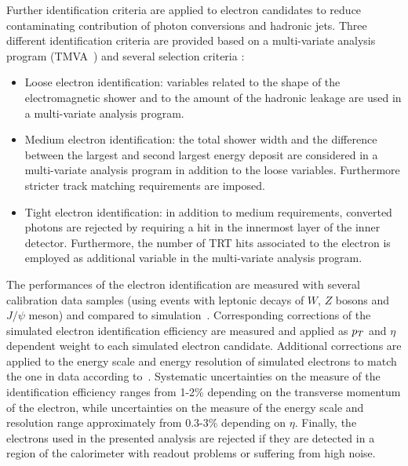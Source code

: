 Further identification criteria are applied to electron candidates to reduce contaminating contribution of 
photon conversions and hadronic jets. Three different identification criteria are provided based on a multi-variate
analysis program (TMVA~\cite{TMVA}) and several selection criteria :
\begin{itemize}
	\item Loose electron identification: variables related to the shape of the electromagnetic shower and 
	to the amount of the hadronic leakage are used in a multi-variate analysis program.
	\item Medium electron identification: the total shower width and the difference between the largest and second largest 
	energy deposit are considered in a multi-variate analysis program in addition to the loose variables. Furthermore  stricter 
	track matching requirements are imposed.
	\item Tight electron identification: in addition to medium requirements, 
		converted photons are rejected by requiring a hit in the innermost layer of the inner detector. 
		Furthermore, the number of TRT hits associated to the electron is employed as additional variable 
		in the multi-variate analysis program.
\end{itemize}

The performances of the electron identification are measured with several calibration  
data samples (using events with leptonic decays of $W$, $Z$ bosons and $J/\psi$ meson) 
and compared to simulation~\cite{eleEff}. Corresponding corrections of the simulated electron identification efficiency are measured
 and applied as $p_{T}$ and $\eta$ dependent weight to each simulated electron candidate. Additional corrections are applied to the energy 
scale and energy resolution of simulated electrons to match the one in data according to~\cite{eleEnergy}.
Systematic uncertainties on the measure of the identification efficiency ranges from 1-2\% depending on the transverse momentum of the electron,
while uncertainties on the measure of the energy scale and resolution range approximately from 0.3-3\% depending on $\eta$.
Finally, the electrons used in the presented analysis are rejected if  they are detected in a region of the 
calorimeter with readout problems or suffering from high noise.

